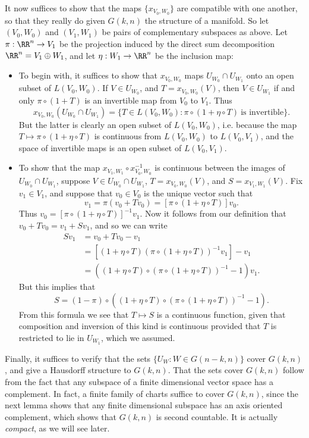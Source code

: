 It now suffices to show that the maps $\{ x_{V_0,W_0} \}$ are compatible with one another, so that they really do given $G(k,n)$ the structure of a manifold. So let $(V_0,W_0)$ and $(V_1,W_1)$ be pairs of complementary subspaces as above. Let $\pi: \RR^n \to V_1$ be the projection induced by the direct sum decomposition $\RR^n = V_1 \oplus W_1$, and let $\eta: W_1 \to \RR^n$ be the inclusion map:
%
\begin{itemize}
    \item To begin with, it suffices to show that $x_{V_0,W_0}$ maps $U_{W_0} \cap U_{W_1}$ onto an open subset of $L(V_0,W_0)$. If $V \in U_{W_0}$, and $T = x_{V_0,W_0}(V)$, then $V \in U_{W_1}$ if and only $\pi \circ (1 + T)$ is an invertible map from $V_0$ to $V_1$. Thus
    \[ x_{V_0,W_0}(U_{W_0} \cap U_{W_1}) = \{ T \in L(V_0,W_0): \pi \circ (1 + \eta \circ T)\ \text{is invertible} \}. \]
    But the latter is clearly an open subset of $L(V_0,W_0)$, i.e. because the map $T \mapsto \pi \circ (1 + \eta \circ T)$ is continuous from $L(V_0,W_0)$ to $L(V_0,V_1)$, and the space of invertible maps is an open subset of $L(V_0,V_1)$.

    \item To show that the map $x_{V_1,W_1} \circ x_{V_0,W_0}^{-1}$ is continuous between the images of $U_{W_0} \cap U_{W_1}$, suppose $V \in U_{W_0} \cap U_{W_1}$, $T = x_{V_0,W_0}(V)$, and $S = x_{V_1,W_1}(V)$. Fix $v_1 \in V_1$, and suppose that $v_0 \in V_0$ is the unique vector such that
    \[ v_1 = \pi(v_0 + Tv_0) = [\pi \circ (1 + \eta \circ T)] v_0. \]
    Thus $v_0 = [\pi \circ (1 + \eta \circ T)]^{-1} v_1$. Now it follows from our definition that $v_0 + Tv_0 = v_1 + Sv_1$, and so we can write
    \begin{align*}
        Sv_1 &= v_0 + Tv_0 - v_1\\
        &= [(1 + \eta \circ T) (\pi \circ (1 + \eta \circ T))^{-1} v_1] - v_1\\
        &= \left( (1 + \eta \circ T) \circ (\pi \circ (1 + \eta \circ T))^{-1} - 1 \right) v_1.
    \end{align*}
    But this implies that
    \[ S = (1 - \pi) \circ \left( (1 + \eta \circ T) \circ (\pi \circ (1 + \eta \circ T))^{-1} - 1 \right). \]
    From this formula we see that $T \mapsto S$ is a continuous function, given that composition and inversion of this kind is continuous provided that $T$ is restricted to lie in $U_{W_1}$, which we assumed.
\end{itemize}
%
Finally, it suffices to verify that the sets $\{ U_W: W \in G(n-k,n) \}$ cover $G(k,n)$, and give a Hausdorff structure to $G(k,n)$. That the sets cover $G(k,n)$ follow from the fact that any subspace of a finite dimensional vector space has a complement. In fact, a finite family of charts suffice to cover $G(k,n)$, since the next lemma shows that any finite dimensional subspace has an axis oriented complement, which shows that $G(k,n)$ is second countable. It is actually \emph{compact}, as we will see later.

